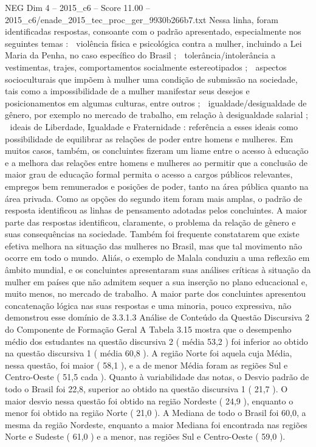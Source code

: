 \begin{textsample}{NEG Dim 4 – 2015\_c6 – Score 11.00 – 2015\_c6/enade\_2015\_tec\_proc\_ger\_9930b266b7.txt}
Nessa linha, foram identificadas respostas, consoante com o padrão apresentado, especialmente nos seguintes temas :  violência física e psicológica contra a mulher, incluindo a Lei Maria da Penha, no caso específico do Brasil ;  tolerância/intolerância a vestimentas, trajes, comportamentos socialmente estereotipados ;  aspectos socioculturais que impõem à mulher uma condição de submissão na sociedade, tais como a impossibilidade de a mulher manifestar seus desejos e posicionamentos em algumas culturas, entre outros ;  igualdade/desigualdade de gênero, por exemplo no mercado de trabalho, em relação à desigualdade salarial ;  ideais de Liberdade, Igualdade e Fraternidade : referência a esses ideais como possibilidade de equilibrar as relações de poder entre homens e mulheres.
Em muitos casos, também, os concluintes fizeram um liame entre o acesso à educação e a melhora das relações entre homens e mulheres ao permitir que a conclusão de maior grau de educação formal permita o acesso a cargos públicos relevantes, empregos bem remunerados e posições de poder, tanto na área pública quanto na área privada.
Como as opções do segundo item foram mais amplas, o padrão de resposta identificou as linhas de pensamento adotadas pelos concluintes.
A maior parte das respostas identificou, claramente, o problema da relação de gênero e suas consequências na sociedade.
Também foi frequente constatarem que existe efetiva melhora na situação das mulheres no Brasil, mas que tal movimento não ocorre em todo o mundo.
Aliás, o exemplo de Malala conduziu a uma reflexão em âmbito mundial, e os concluintes apresentaram suas análises críticas à situação da mulher em países que não admitem sequer a sua inserção no plano educacional e, muito menos, no mercado de trabalho.
A maior parte dos concluintes apresentou concatenação lógica nas suas respostas e uma minoria, pouco expressiva, não demonstrou esse domínio de 3.3.1.3 Análise de Conteúdo da Questão Discursiva 2 do Componente de Formação Geral A Tabela 3.15 mostra que o desempenho médio dos estudantes na questão discursiva 2 ( média 53,2 ) foi inferior ao obtido na questão discursiva 1 ( média 60,8 ).
A região Norte foi aquela cuja Média, nessa questão, foi maior ( 58,1 ), e a de menor Média foram as regiões Sul e Centro-Oeste ( 51,5 cada ).
Quanto à variabilidade das notas, o Desvio padrão de todo o Brasil foi 22,8, superior ao obtido na questão discursiva 1 ( 21,7 ).
O maior desvio nessa questão foi obtido na região Nordeste ( 24,9 ), enquanto o menor foi obtido na região Norte ( 21,0 ).
A Mediana de todo o Brasil foi 60,0, a mesma da região Nordeste, enquanto a maior Mediana foi encontrada nas regiões Norte e Sudeste ( 61,0 ) e a menor, nas regiões Sul e Centro-Oeste ( 59,0 ).

\end{textsample}
